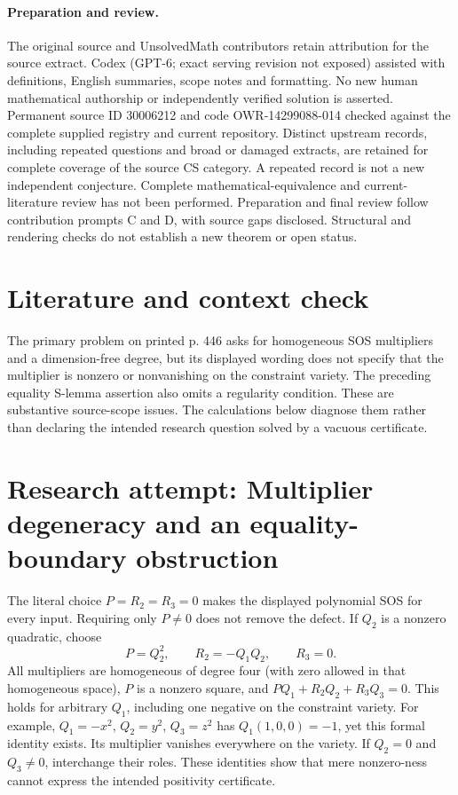 \documentclass[11pt]{article}
\begin{document}
\paragraph{Preparation and review.}
The original source and UnsolvedMath contributors retain attribution for the source extract. Codex (GPT-6; exact serving revision not exposed) assisted with definitions, English summaries, scope notes and formatting. No new human mathematical authorship or independently verified solution is asserted. Permanent source ID 30006212 and code OWR-14299088-014 checked against the complete supplied registry and current repository. Distinct upstream records, including repeated questions and broad or damaged extracts, are retained for complete coverage of the source CS category. A repeated record is not a new independent conjecture. Complete mathematical-equivalence and current-literature review has not been performed. Preparation and final review follow contribution prompts C and D, with source gaps disclosed. Structural and rendering checks do not establish a new theorem or open status.
\label{end:30006212}

\section{Literature and context check}
The primary problem on printed p. 446 asks for homogeneous SOS multipliers and a dimension-free degree, but its displayed wording does not specify that the multiplier is nonzero or nonvanishing on the constraint variety. The preceding equality S-lemma assertion also omits a regularity condition. These are substantive source-scope issues. The calculations below diagnose them rather than declaring the intended research question solved by a vacuous certificate.
\section{Research attempt: Multiplier degeneracy and an equality-boundary obstruction}

The literal choice $P=R_2=R_3=0$ makes the displayed polynomial SOS for every input. Requiring only $P\ne0$ does not remove the defect. If $Q_2$ is a nonzero quadratic, choose
\[
P=Q_2^2,\qquad R_2=-Q_1Q_2,\qquad R_3=0.
\]
All multipliers are homogeneous of degree four (with zero allowed in that homogeneous space), $P$ is a nonzero square, and $PQ_1+R_2Q_2+R_3Q_3=0$. This holds for arbitrary $Q_1$, including one negative on the constraint variety. For example, $Q_1=-x^2$, $Q_2=y^2$, $Q_3=z^2$ has $Q_1(1,0,0)=-1$, yet this formal identity exists. Its multiplier vanishes everywhere on the variety. If $Q_2=0$ and $Q_3\ne0$, interchange their roles. These identities show that mere nonzero-ness cannot express the intended positivity certificate.
\end{document}

